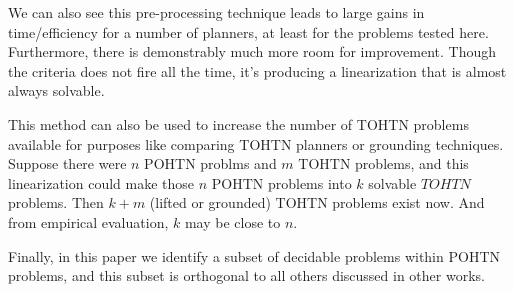 \documentclass[letterpaper]{article} %
\begin{document}
We can also see this pre-processing technique leads to large gains in time/efficiency for a number of planners, at least for the problems tested here. Furthermore, there is demonstrably much more room for improvement. Though the criteria does not fire all the time, it's producing a linearization that is almost always solvable.

This method can also be used to increase the number of TOHTN problems available for purposes like comparing TOHTN planners or grounding techniques. Suppose there were $n$ POHTN problms and $m$ TOHTN problems, and this linearization could make those $n$ POHTN problems into $k$ solvable $TOHTN$ problems. Then $k+m$ (lifted or grounded) TOHTN problems exist now. And from empirical evaluation, $k$ may be close to $n$.

Finally, in this paper we identify a subset of decidable problems within POHTN problems, and this subset is orthogonal to all others discussed in other works.










\end{document}
